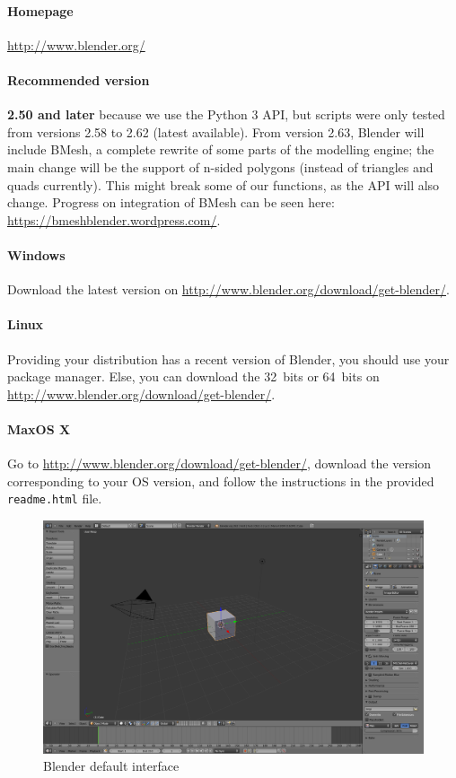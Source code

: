 \documentclass{article}
\begin{document}
	\paragraph{Homepage} \url{http://www.blender.org/}

	\paragraph{Recommended version} \textbf{2.50 and later} because we use the Python 3 API, but scripts were only tested from versions 2.58 to 2.62 (latest available). From version 2.63, Blender will include BMesh, a complete rewrite of some parts of the modelling engine; the main change will be the support of n-sided polygons (instead of triangles and quads currently). This might break some of our functions, as the API will also change. Progress on integration of BMesh can be seen here: \url{https://bmeshblender.wordpress.com/}.

	\paragraph{Windows} Download the latest version on \url{http://www.blender.org/download/get-blender/}.

	\paragraph{Linux} Providing your distribution has a recent version of Blender, you should use your package manager. Else, you can download the 32~bits or 64~bits on \url{http://www.blender.org/download/get-blender/}.

	\paragraph{MaxOS X} Go to \url{http://www.blender.org/download/get-blender/}, download the version corresponding to your OS version, and follow the instructions in the provided \texttt{readme.html} file.

	\begin{figure}[h!]
		\centering
		\includegraphics[width=\linewidth]{blender.png}
		\caption{Blender default interface}
	\end{figure}
\end{document}
